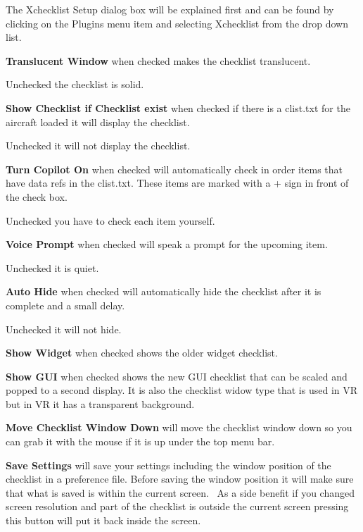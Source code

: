\documentclass[11pt,parskip=half,a4paper]{scrartcl}
\begin{document}
The {\textquotedbl}Xchecklist Setup{\textquotedbl} dialog box will be explained first and can be found by clicking on the Plugins menu item and selecting Xchecklist from the drop down list. 

\textbf{Translucent Window} when checked makes the checklist translucent.

Unchecked the checklist is solid. \newline

\textbf{Show Checklist if Checklist exist} when checked if there is a clist.txt for the aircraft loaded it will 
display the checklist. 

Unchecked it will not display the checklist. \newline

\textbf{Turn Copilot On} when checked will automatically check in order items that have data refs in the 
clist.txt. These items are marked with a + sign in front of the check box. 

Unchecked you have to check each item yourself. \newline

\textbf{Voice Prompt} when checked will speak a prompt for the upcoming item.

Unchecked it is quiet. \newline

\textbf{Auto Hide} when checked will automatically hide the checklist after it is complete and a small delay. 

Unchecked it will not hide. \newline

\newpage

\textbf{Show Widget} when checked shows the older widget checklist. \newline

\textbf{Show GUI} when checked shows the new GUI checklist that can be scaled and popped to a second display.
It is also the checklist widow type that is used in VR but in VR it has a transparent background. \newline

\textbf{Move Checklist Window Down} will move the checklist window down so you can grab it with the mouse if it is up under the top menu bar. \newline

\textbf{Save Settings} will save your settings including the window position of the checklist in a preference file. Before saving the window position it will make sure that what is saved is within the current screen. \ As a side benefit if you changed screen resolution and part of the checklist is outside the current screen pressing this button will put it back inside the screen.
\end{document}
